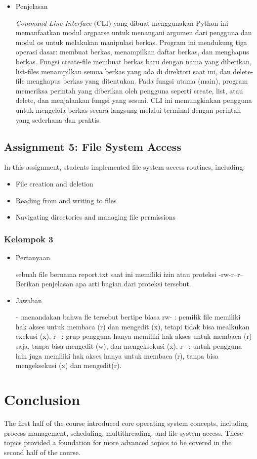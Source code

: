 \documentclass[12pt]{article}
\begin{document}
\begin{itemize}
    \item Penjelasan

\textit{Command-Line Interface} (CLI) yang dibuat menggunakan Python ini memanfaatkan modul argparse untuk menangani argumen dari pengguna dan modul os untuk melakukan manipulasi berkas. Program ini mendukung tiga operasi dasar: membuat berkas, menampilkan daftar berkas, dan menghapus berkas. Fungsi create-file membuat berkas baru dengan nama yang diberikan, list-files menampilkan semua berkas yang ada di direktori saat ini, dan delete-file menghapus berkas yang ditentukan. Pada fungsi utama (main), program memeriksa perintah yang diberikan oleh pengguna seperti create, list, atau delete, dan menjalankan fungsi yang sesuai. CLI ini memungkinkan pengguna untuk mengelola berkas secara langsung melalui terminal dengan perintah yang sederhana dan praktis.
    
\end{itemize}

\subsection{Assignment 5: File System Access}
In this assignment, students implemented file system access routines, including:
\begin{itemize}
    \item File creation and deletion
    \item Reading from and writing to files
    \item Navigating directories and managing file permissions
\end{itemize}
\subsubsection{Kelompok 3}

\begin{itemize}
    \item  Pertanyaan 
    
    sebuah file bernama report.txt saat ini memiliki izin atau proteksi -rw-r--r-- Berikan penjelasan apa arti bagian dari proteksi tersebut.
\end{itemize}


\begin{itemize}
        \item Jawaban 
        
        - :menandakan bahwa fle tersebut bertipe biasa rw- : pemilik file memiliki hak akses untuk membaca (r) dan mengedit (x), tetapi tidak bisa mealkukan exekusi (x). r-- : grup pengguna hanya memiliki hak akses untuk membaca (r) saja, tanpa bisa mengedit (w), dan mengeksekusi (x). r-- : untuk pengguna lain juga memiliki hak akses hanya untuk membaca (r), tanpa bisa mengeksekusi (x) dan mengedit(r).
    \end{itemize}

\section{Conclusion}
The first half of the course introduced core operating system concepts, including process management, scheduling, multithreading, and file system access. These topics provided a foundation for more advanced topics to be covered in the second half of the course.
\end{document}
